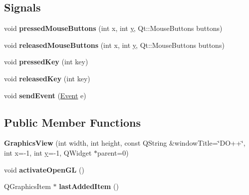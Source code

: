 \subsection*{Signals}
\begin{DoxyCompactItemize}
\item 
\hypertarget{class_d_o_1_1_graphics_view_a211d59c0a6baf6072e762c542472efe6}{void {\bfseries pressed\-Mouse\-Buttons} (int x, int \hyperlink{group___channel_accessors_gac90c52c5b3a7b2a7e3761e6e84f25778}{y}, Qt\-::\-Mouse\-Buttons buttons)}\label{class_d_o_1_1_graphics_view_a211d59c0a6baf6072e762c542472efe6}

\item 
\hypertarget{class_d_o_1_1_graphics_view_aa6e288186f3b4d8668cbcb77d4d5cc71}{void {\bfseries released\-Mouse\-Buttons} (int x, int \hyperlink{group___channel_accessors_gac90c52c5b3a7b2a7e3761e6e84f25778}{y}, Qt\-::\-Mouse\-Buttons buttons)}\label{class_d_o_1_1_graphics_view_aa6e288186f3b4d8668cbcb77d4d5cc71}

\item 
\hypertarget{class_d_o_1_1_graphics_view_af3120a375a321654553779cf030a9508}{void {\bfseries pressed\-Key} (int key)}\label{class_d_o_1_1_graphics_view_af3120a375a321654553779cf030a9508}

\item 
\hypertarget{class_d_o_1_1_graphics_view_ac80bf1948c09a26181b72cb51f4ea4c3}{void {\bfseries released\-Key} (int key)}\label{class_d_o_1_1_graphics_view_ac80bf1948c09a26181b72cb51f4ea4c3}

\item 
\hypertarget{class_d_o_1_1_graphics_view_a497371cbad118b80dc07aa5c288f2573}{void {\bfseries send\-Event} (\hyperlink{struct_d_o_1_1_event}{Event} e)}\label{class_d_o_1_1_graphics_view_a497371cbad118b80dc07aa5c288f2573}

\end{DoxyCompactItemize}
\subsection*{Public Member Functions}
\begin{DoxyCompactItemize}
\item 
\hypertarget{class_d_o_1_1_graphics_view_a99b0aad23396733b0d8d2c859e9a046b}{{\bfseries Graphics\-View} (int width, int height, const Q\-String \&window\-Title=\char`\"{}D\-O++\char`\"{}, int x=-\/1, int \hyperlink{group___channel_accessors_gac90c52c5b3a7b2a7e3761e6e84f25778}{y}=-\/1, Q\-Widget $\ast$parent=0)}\label{class_d_o_1_1_graphics_view_a99b0aad23396733b0d8d2c859e9a046b}

\item 
\hypertarget{class_d_o_1_1_graphics_view_abad4cda0b2ed3e149d7da9923cd79f43}{void {\bfseries activate\-Open\-G\-L} ()}\label{class_d_o_1_1_graphics_view_abad4cda0b2ed3e149d7da9923cd79f43}

\item 
\hypertarget{class_d_o_1_1_graphics_view_aa33de3fac6475fcdd725a2ca8ad62d4e}{Q\-Graphics\-Item $\ast$ {\bfseries last\-Added\-Item} ()}\label{class_d_o_1_1_graphics_view_aa33de3fac6475fcdd725a2ca8ad62d4e}

\end{DoxyCompactItemize}
